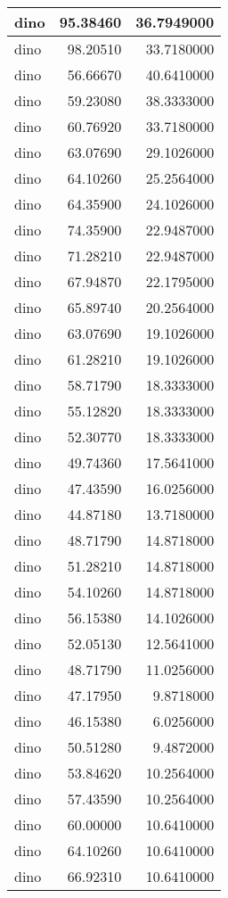 \documentclass[
]{book}
\theoremstyle{definition}
\theoremstyle{definition}
\theoremstyle{definition}
\theoremstyle{definition}
\theoremstyle{remark}
\begin{document}
\begin{tabular}{l|r|r}
\hline
dino & 95.38460 & 36.7949000\\
\hline
dino & 98.20510 & 33.7180000\\
\hline
dino & 56.66670 & 40.6410000\\
\hline
dino & 59.23080 & 38.3333000\\
\hline
dino & 60.76920 & 33.7180000\\
\hline
dino & 63.07690 & 29.1026000\\
\hline
dino & 64.10260 & 25.2564000\\
\hline
dino & 64.35900 & 24.1026000\\
\hline
dino & 74.35900 & 22.9487000\\
\hline
dino & 71.28210 & 22.9487000\\
\hline
dino & 67.94870 & 22.1795000\\
\hline
dino & 65.89740 & 20.2564000\\
\hline
dino & 63.07690 & 19.1026000\\
\hline
dino & 61.28210 & 19.1026000\\
\hline
dino & 58.71790 & 18.3333000\\
\hline
dino & 55.12820 & 18.3333000\\
\hline
dino & 52.30770 & 18.3333000\\
\hline
dino & 49.74360 & 17.5641000\\
\hline
dino & 47.43590 & 16.0256000\\
\hline
dino & 44.87180 & 13.7180000\\
\hline
dino & 48.71790 & 14.8718000\\
\hline
dino & 51.28210 & 14.8718000\\
\hline
dino & 54.10260 & 14.8718000\\
\hline
dino & 56.15380 & 14.1026000\\
\hline
dino & 52.05130 & 12.5641000\\
\hline
dino & 48.71790 & 11.0256000\\
\hline
dino & 47.17950 & 9.8718000\\
\hline
dino & 46.15380 & 6.0256000\\
\hline
dino & 50.51280 & 9.4872000\\
\hline
dino & 53.84620 & 10.2564000\\
\hline
dino & 57.43590 & 10.2564000\\
\hline
dino & 60.00000 & 10.6410000\\
\hline
dino & 64.10260 & 10.6410000\\
\hline
dino & 66.92310 & 10.6410000\\

\end{tabular}
\end{document}
